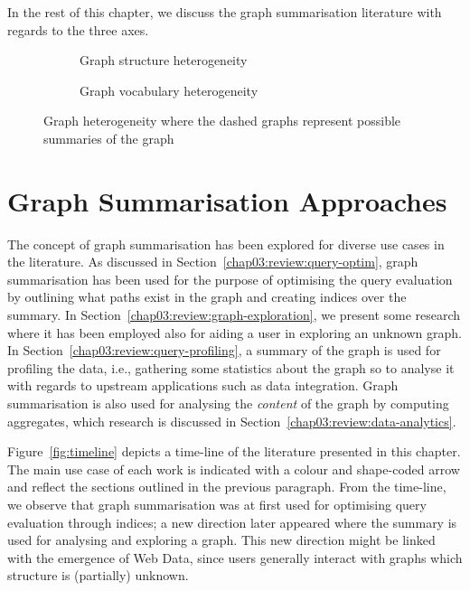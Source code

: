 In the rest of this chapter, we discuss the graph summarisation literature with regards to the three axes.

\begin{figure}
	\centering
	\begin{subfigure}{.5\textwidth}
		\resizebox{\textwidth}{!}{
			
		}
		\caption{Graph structure heterogeneity}
		\label{fig:hetero-struct}
	\end{subfigure}
	\qquad
	\begin{subfigure}{.42\textwidth}
		\resizebox{\textwidth}{!}{
			
		}
		\caption{Graph vocabulary heterogeneity}
		\label{fig:hetero-voc}
	\end{subfigure}
	\caption{Graph heterogeneity where the dashed graphs represent possible summaries of the graph}
	\label{fig:graph-hetero}
\end{figure}

\section{Graph Summarisation Approaches}

The concept of graph summarisation has been explored for diverse use cases in the literature. As discussed in Section~\ref{chap03:review:query-optim}, graph summarisation has been used for the purpose of optimising the query evaluation by outlining what paths exist in the graph and creating indices over the summary. In Section~\ref{chap03:review:graph-exploration}, we present some research where it has been employed also for aiding a user in exploring an unknown graph. In Section~\ref{chap03:review:query-profiling}, a summary of the graph is used for profiling the data, i.e., gathering some statistics about the graph so to analyse it with regards to upstream applications such as data integration. Graph summarisation is also used for analysing the \emph{content} of the graph by computing aggregates, which research is discussed in Section~\ref{chap03:review:data-analytics}.

Figure~\ref{fig:timeline} depicts a time-line of the literature presented in this chapter. The main use case of each work is indicated with a colour and shape-coded arrow and reflect the sections outlined in the previous paragraph. From the time-line, we observe that graph summarisation was at first used for optimising query evaluation through indices; a new direction later appeared where the summary is used for analysing and exploring a graph. This new direction might be linked with the emergence of Web Data, since users generally interact with graphs which structure is (partially) unknown.

